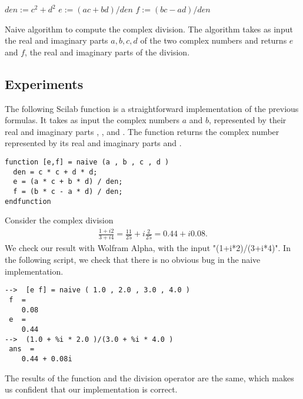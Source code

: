 \begin{algorithm}[htbp]
$den := c^2 + d^2$\;
$e := (ac + bd)/ den$\;
$f := (bc - ad)/ den$\;
\caption{Naive algorithm to compute the complex division. The algorithm takes as input the 
real and imaginary parts $a,b,c,d$ of the two complex numbers and returns 
$e$ and $f$, the real and imaginary parts of the division.}
\label{naive-complexdivision}
\end{algorithm}

\subsection{Experiments}

The following Scilab function  is a straightforward implementation
of the previous formulas. It takes as input the complex numbers $a$ and $b$, 
represented by their real and imaginary parts , ,  and 
. The function  returns the complex number represented 
by its real and imaginary parts  and .
\lstset{language=scilabscript}
\begin{lstlisting}
function [e,f] = naive (a , b , c , d )
  den = c * c + d * d;
  e = (a * c + b * d) / den;
  f = (b * c - a * d) / den;
endfunction
\end{lstlisting}

Consider the complex division
\begin{eqnarray}
\label{eq-cd-firstest}
\frac{1 + i2}{3 + i4} = \frac{11}{25}+i \frac{2}{25}= 0.44 +i 0.08 .
\end{eqnarray}
We check our result with Wolfram Alpha\cite{WWWWolframAlpha}, with 
the input "(1+i*2)/(3+i*4)".
In the following script, we check that there is no obvious bug 
in the naive implementation.
\lstset{language=scilabscript}
\begin{lstlisting}
-->  [e f] = naive ( 1.0 , 2.0 , 3.0 , 4.0 )
 f  =
    0.08  
 e  =
    0.44  
-->  (1.0 + %i * 2.0 )/(3.0 + %i * 4.0 )
 ans  =
    0.44 + 0.08i  
\end{lstlisting}
The results of the  function and the division operator are the same,
which makes us confident that our implementation is correct.

